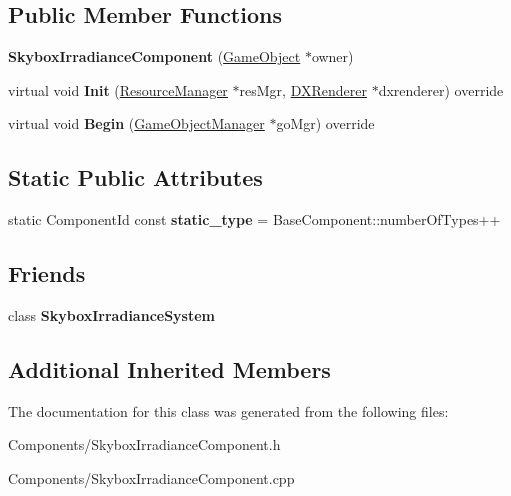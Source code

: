 \subsection*{Public Member Functions}
\begin{DoxyCompactItemize}
\item 
\mbox{\label{classSkyboxIrradianceComponent_ad2bccd8dec83d3e0f431ed4a7b27d981}} 
{\bfseries Skybox\+Irradiance\+Component} (\hyperlink{classGameObject}{Game\+Object} $\ast$owner)
\item 
\mbox{\label{classSkyboxIrradianceComponent_acb579a9a034d27a66da83960a973ea25}} 
virtual void {\bfseries Init} (\hyperlink{classResourceManager}{Resource\+Manager} $\ast$res\+Mgr, \hyperlink{classDXRenderer}{D\+X\+Renderer} $\ast$dxrenderer) override
\item 
\mbox{\label{classSkyboxIrradianceComponent_a39357a3138b9727a31df30f2b8f2a42d}} 
virtual void {\bfseries Begin} (\hyperlink{classGameObjectManager}{Game\+Object\+Manager} $\ast$go\+Mgr) override
\end{DoxyCompactItemize}
\subsection*{Static Public Attributes}
\begin{DoxyCompactItemize}
\item 
\mbox{\label{classSkyboxIrradianceComponent_a8b75ec924103eae4f89b83d0531847ac}} 
static Component\+Id const {\bfseries static\+\_\+type} = Base\+Component\+::number\+Of\+Types++
\end{DoxyCompactItemize}
\subsection*{Friends}
\begin{DoxyCompactItemize}
\item 
\mbox{\label{classSkyboxIrradianceComponent_a59dd106587626978b72dd84990bdf562}} 
class {\bfseries Skybox\+Irradiance\+System}
\end{DoxyCompactItemize}
\subsection*{Additional Inherited Members}


The documentation for this class was generated from the following files\+:\begin{DoxyCompactItemize}
\item 
Components/Skybox\+Irradiance\+Component.\+h\item 
Components/Skybox\+Irradiance\+Component.\+cpp\end{DoxyCompactItemize}
